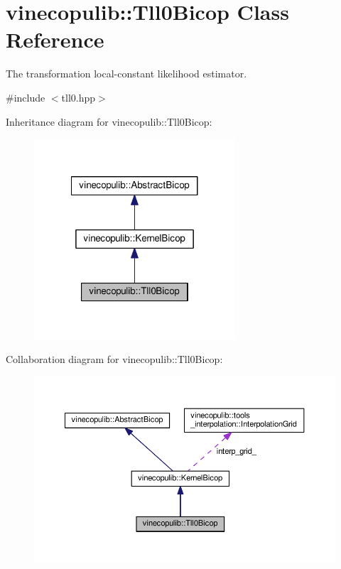\hypertarget{classvinecopulib_1_1_tll0_bicop}{\section{vinecopulib\+:\+:Tll0\+Bicop Class Reference}
\label{classvinecopulib_1_1_tll0_bicop}
}


The transformation local-\/constant likelihood estimator.  




{\ttfamily \#include $<$tll0.\+hpp$>$}



Inheritance diagram for vinecopulib\+:\+:Tll0\+Bicop\+:\nopagebreak
\begin{figure}[H]
\begin{center}
\leavevmode
\includegraphics[width=212pt]{classvinecopulib_1_1_tll0_bicop__inherit__graph}
\end{center}
\end{figure}


Collaboration diagram for vinecopulib\+:\+:Tll0\+Bicop\+:\nopagebreak
\begin{figure}[H]
\begin{center}
\leavevmode
\includegraphics[width=350pt]{classvinecopulib_1_1_tll0_bicop__coll__graph}
\end{center}
\end{figure}
